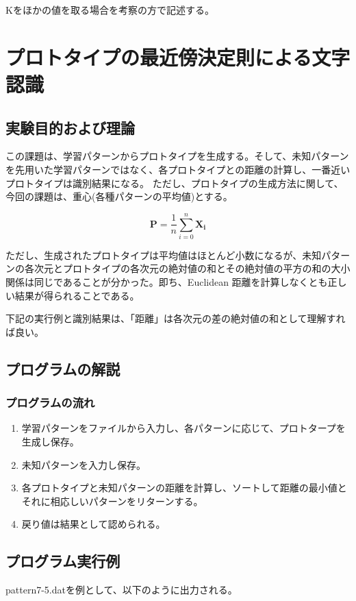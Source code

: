 \documentclass[ %
  uplatex,%
  papersize%
]{jsarticle}
\begin{document}
Kをほかの値を取る場合を考察の方で記述する。

\section{プロトタイプの最近傍決定則による文字認識}
\subsection{実験目的および理論}
この課題は、学習パターンからプロトタイプを生成する。そして、未知パターンを先用いた学習パターンではなく、各プロトタイプとの距離の計算し、一番近いプロトタイプは識別結果になる。
ただし、プロトタイプの生成方法に関して、今回の課題は、重心(各種パターンの平均値)とする。

$$\bm{P}=\frac{1}{n}\sum_{i=0}^{n}\bm{X_{i}}$$

ただし、生成されたプロトタイプは平均値はほとんど小数になるが、未知パターンの各次元とプロトタイプの各次元の絶対値の和とその絶対値の平方の和の大小関係は同じであることが分かった。即ち、Euclidean 距離を計算しなくとも正しい結果が得られることである。

下記の実行例と識別結果は、「距離」は各次元の差の絶対値の和として理解すれば良い。

\subsection{プログラムの解説}
\subsubsection{プログラムの流れ}

\begin{enumerate}
\small
\item 学習パターンをファイルから入力し、各パターンに応じて、プロトタープを生成し保存。
\item 未知パターンを入力し保存。
\item 各プロトタイプと未知パターンの距離を計算し、ソートして距離の最小値とそれに相応しいパターンをリターンする。
\item 戻り値は結果として認められる。
\end{enumerate}

\subsection{プログラム実行例}

pattern7-5.datを例として、以下のように出力される。
\end{document}
